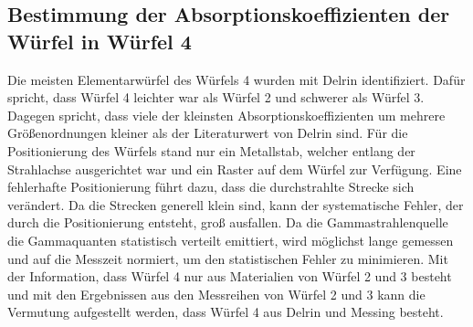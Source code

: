 \subsection{Bestimmung der Absorptionskoeffizienten der Würfel in Würfel 4}

Die meisten Elementarwürfel des Würfels 4 wurden mit Delrin identifiziert. Dafür spricht, dass Würfel 4 leichter war 
als Würfel 2 und schwerer als Würfel 3. Dagegen spricht, dass viele der kleinsten Absorptionskoeffizienten 
um mehrere Größenordnungen kleiner als der Literaturwert von 
Delrin sind.
Für die Positionierung des Würfels stand nur ein Metallstab, welcher entlang der Strahlachse ausgerichtet war und ein Raster auf dem Würfel zur Verfügung.
Eine fehlerhafte Positionierung führt dazu, dass die durchstrahlte Strecke sich verändert. Da die Strecken generell klein sind, 
kann der systematische Fehler, der durch die Positionierung entsteht, groß ausfallen. Da die Gammastrahlenquelle die 
Gammaquanten statistisch verteilt emittiert, wird möglichst lange gemessen und auf die Messzeit normiert, um den statistischen 
Fehler zu minimieren.
Mit der Information, dass Würfel 4 nur aus Materialien von Würfel 2 und 3 besteht und mit den Ergebnissen aus den Messreihen
von Würfel 2 und 3 kann die Vermutung aufgestellt werden, dass Würfel 4 aus Delrin und Messing besteht. 
\newpage